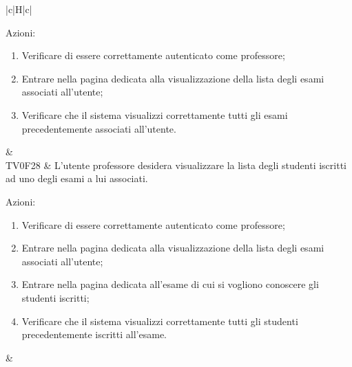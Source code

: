 \begin{longtable}{|c|H|c|}
\begin{flushleft}
			Azioni:\newline
		\end{flushleft}
		\begin{enumerate}
			\item Verificare di essere correttamente autenticato come professore;
			\item Entrare nella pagina dedicata alla visualizzazione della lista degli esami associati all'utente;
			\item Verificare che il sistema visualizzi correttamente tutti gli esami precedentemente associati all'utente.
		\end{enumerate} & \Ts \\
		\hline
		TV0F28 & L'utente professore desidera visualizzare la lista degli studenti iscritti ad uno degli esami a lui associati. \newline \begin{flushleft}
			Azioni:\newline
		\end{flushleft}
		\begin{enumerate}
			\item Verificare di essere correttamente autenticato come professore;
			\item Entrare nella pagina dedicata alla visualizzazione della lista degli esami associati all'utente;
			\item Entrare nella pagina dedicata all'esame di cui si vogliono conoscere gli studenti iscritti;
			\item Verificare che il sistema visualizzi correttamente tutti gli studenti precedentemente iscritti all'esame.
		\end{enumerate} & \Ts \\
	\hline
	\caption[Test di validazione]{Test di validazione}
	\label{tabella:TV}
\end{longtable}

